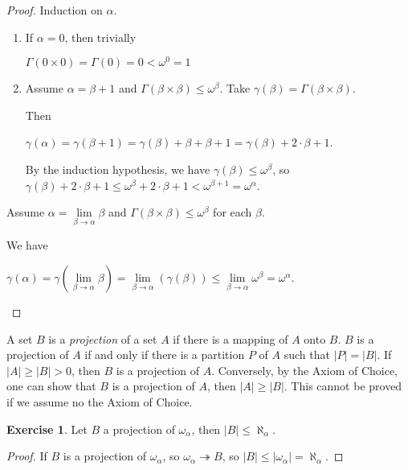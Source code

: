 \documentclass[8pt]{article}
\theoremstyle{definition}
\theoremstyle{definition}
\theoremstyle{definition}
\theoremstyle{definition}
\theoremstyle{definition}
\theoremstyle{definition}
\theoremstyle{definition}
\theoremstyle{definition}
\theoremstyle{definition}
\theoremstyle{definition}
\theoremstyle{definition}
\theoremstyle{definition}
\theoremstyle{definition}
\newtheorem{exercise}{Exercise}[section]
\theoremstyle{definition}
\theoremstyle{question}
\begin{document}
\begin{proof}

Induction on $\alpha$.

\begin{enumerate}
\item If $\alpha = 0$, then trivially
\begin{center}
  $\Gamma(0 \times 0) = \Gamma(0) = 0 < \omega^0 = 1$
\end{center}
\item Assume $\alpha = \beta + 1$ and $\Gamma(\beta \times \beta) \leq \omega^{\beta}$.
Take $\gamma(\beta) = \Gamma(\beta \times \beta)$.

Then
\begin{center}
$\gamma(\alpha) = \gamma(\beta + 1) = \gamma(\beta) + \beta + \beta + 1 = \gamma(\beta) + 2 \cdot \beta + 1$.
\end{center}

By the induction hypothesis, we have $\gamma(\beta) \leq \omega^{\beta}$, so
$\gamma(\beta) + 2 \cdot \beta + 1 \leq \omega^{\beta} + 2 \cdot \beta + 1 < \omega^{\beta + 1} = \omega^{\alpha}$.
\end{enumerate}
\item Assume $\alpha = \lim \limits_{\beta \to \alpha} \beta$ and $\Gamma(\beta \times \beta) \leq \omega^{\beta}$ for each $\beta$.

We have
\begin{center}
$\gamma(\alpha) = \gamma(\lim \limits_{\beta \to \alpha} \beta) = \lim \limits_{\beta \to \alpha} (\gamma(\beta)) \leq 
\lim \limits_{\beta \to \alpha} \omega^{\beta} = \omega^{\alpha}$.
\end{center}

\end{proof}

A set $B$ is a \emph{projection} of a set $A$ if there is a mapping of $A$ onto $B$.
$B$ is a projection of $A$ if and only if there is a partition $P$ of $A$ such that $|P| = |B|$.
If $|A| \geq |B| > 0$, then $B$ is a projection of $A$. 
Conversely, by the Axiom of Choice, one can show that $B$ is a projection of $A$, then $|A| \geq |B|$.
This cannot be proved if we assume no the Axiom of Choice.

\begin{exercise}
  Let $B$ a projection of $\omega_{\alpha}$, then $|B| \leq \aleph_{\alpha}$.
\end{exercise}

\begin{proof}
  If $B$ is a projection of $\omega_{\alpha}$, so 
  $\omega_{\alpha} \twoheadrightarrow B$, so $|B| \leq |\omega_{\alpha}| = \aleph_{\alpha}$.
\end{proof}
\end{document}
